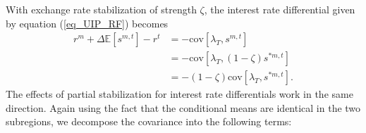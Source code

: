 With exchange rate stabilization of strength $\zeta$, the interest
rate differential given by equation (\ref{eq_UIP_RF}) becomes
\begin{equation*}
  \begin{split}
    r^m+ \Delta \mathbb{E}[s^{m,t}]-r^t&=-\text{cov}\left[\lambda_T,s^{m,t}\right]\\
    &=-\text{cov}\left[\lambda_T,(1-\zeta)s^{\ast m,t}\right]\\
    &=-(1-\zeta)\text{cov}\left[\lambda_T,s^{\ast m,t}\right].
  \end{split}
\end{equation*}
The effects of partial stabilization for interest rate differentials
work in the same direction. Again using the fact that the conditional
means are identical in the two subregions, we decompose the covariance into the following
terms:
